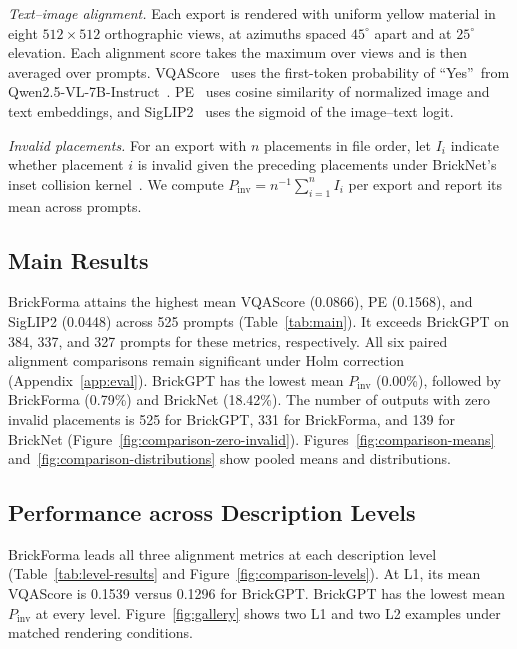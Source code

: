 \documentclass[letterpaper]{article} %
\begin{document}
\emph{Text--image alignment.}
Each export is rendered with uniform yellow material in eight $512{\times}512$ orthographic views, at azimuths spaced $45^\circ$ apart and at $25^\circ$ elevation. Each alignment score takes the maximum over views and is then averaged over prompts. VQAScore~\cite{vqascore} uses the first-token probability of \textquotedblleft Yes\textquotedblright\ from Qwen2.5-VL-7B-Instruct~\cite{qwen25vl}. PE~\cite{pe} uses cosine similarity of normalized image and text embeddings, and SigLIP2~\cite{siglip2} uses the sigmoid of the image--text logit.

\emph{Invalid placements.}
For an export with $n$ placements in file order, let $I_i$ indicate whether placement $i$ is invalid given the preceding placements under BrickNet's inset collision kernel~\cite{bricknet}. We compute $P_{\mathrm{inv}}=n^{-1}\sum_{i=1}^{n}I_i$ per export and report its mean across prompts.

\subsection{Main Results}

BrickForma attains the highest mean VQAScore (0.0866), PE (0.1568), and SigLIP2 (0.0448) across 525 prompts (Table~\ref{tab:main}). It exceeds BrickGPT on 384, 337, and 327 prompts for these metrics, respectively. All six paired alignment comparisons remain significant under Holm correction (Appendix~\ref{app:eval}). BrickGPT has the lowest mean $P_{\mathrm{inv}}$ (0.00\%), followed by BrickForma (0.79\%) and BrickNet (18.42\%). The number of outputs with zero invalid placements is 525 for BrickGPT, 331 for BrickForma, and 139 for BrickNet (Figure~\ref{fig:comparison-zero-invalid}). Figures~\ref{fig:comparison-means} and~\ref{fig:comparison-distributions} show pooled means and distributions.


\subsection{Performance across Description Levels}

BrickForma leads all three alignment metrics at each description level (Table~\ref{tab:level-results} and Figure~\ref{fig:comparison-levels}). At L1, its mean VQAScore is 0.1539 versus 0.1296 for BrickGPT. BrickGPT has the lowest mean $P_{\mathrm{inv}}$ at every level. Figure~\ref{fig:gallery} shows two L1 and two L2 examples under matched rendering conditions.


\end{document}
